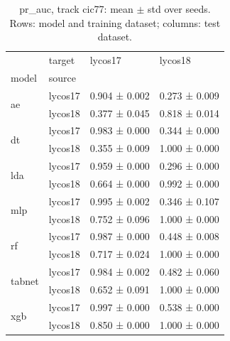 \begin{table}
\caption{pr_auc, track cic77: mean $\pm$ std over seeds. Rows: model and training dataset; columns: test dataset.}
\label{tab:matrix_cic77_pr_auc}
\begin{tabular}{llll}
\toprule
 & target & lycos17 & lycos18 \\
model & source &  &  \\
\midrule
\multirow[t]{2}{*}{ae} & lycos17 & 0.904 ± 0.002 & 0.273 ± 0.009 \\
 & lycos18 & 0.377 ± 0.045 & 0.818 ± 0.014 \\
\cline{1-4}
\multirow[t]{2}{*}{dt} & lycos17 & 0.983 ± 0.000 & 0.344 ± 0.000 \\
 & lycos18 & 0.355 ± 0.009 & 1.000 ± 0.000 \\
\cline{1-4}
\multirow[t]{2}{*}{lda} & lycos17 & 0.959 ± 0.000 & 0.296 ± 0.000 \\
 & lycos18 & 0.664 ± 0.000 & 0.992 ± 0.000 \\
\cline{1-4}
\multirow[t]{2}{*}{mlp} & lycos17 & 0.995 ± 0.002 & 0.346 ± 0.107 \\
 & lycos18 & 0.752 ± 0.096 & 1.000 ± 0.000 \\
\cline{1-4}
\multirow[t]{2}{*}{rf} & lycos17 & 0.987 ± 0.000 & 0.448 ± 0.008 \\
 & lycos18 & 0.717 ± 0.024 & 1.000 ± 0.000 \\
\cline{1-4}
\multirow[t]{2}{*}{tabnet} & lycos17 & 0.984 ± 0.002 & 0.482 ± 0.060 \\
 & lycos18 & 0.652 ± 0.091 & 1.000 ± 0.000 \\
\cline{1-4}
\multirow[t]{2}{*}{xgb} & lycos17 & 0.997 ± 0.000 & 0.538 ± 0.000 \\
 & lycos18 & 0.850 ± 0.000 & 1.000 ± 0.000 \\
\cline{1-4}
\bottomrule
\end{tabular}
\end{table}
